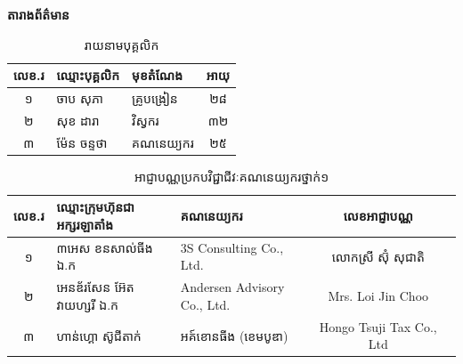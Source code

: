 \documentclass[a4paper]{article}
\begin{document}
{\NormalFont
\begin{justify}
\setlength{\baselineskip}{20pt}
\hspace{1cm}
\end{justify}
}
\begin{center}
    {\NormalFont \textbf{តារាងព័ត៌មាន}}
\end{center}

\vspace{0.5cm}

\begin{table}[h!]
    \centering
    \NormalFont\selectfont
    \begin{tabular}{|c|l|l|c|}
        \hline
        \textbf{លេខ.រ} & \textbf{ឈ្មោះបុគ្គលិក} & \textbf{មុខតំណែង} & \textbf{អាយុ} \\
        \hline
        ១ & ចាប សុភា & គ្រូបង្រៀន & ២៨ \\
        \hline
        ២ & សុខ ដារា & វិស្វករ & ៣២ \\
        \hline
        ៣ & ម៉ែន ចន្ទថា & គណនេយ្យករ & ២៥ \\
        \hline
    \end{tabular}
    \caption{រាយនាមបុគ្គលិក}
\end{table}

\begin{table}[h!]
    \NormalFont\selectfont
    \begin{tabular}{|c|l|l|c|c}
        \hline
        \textbf{លេខ.រ} & \textbf{ឈ្មោះក្រុមហ៊ុនជាអក្សរឡាតាំង} & \textbf{គណនេយ្យករ} ​& \textbf{លេខអាជ្ញាបណ្ណ} \\
        \hline
        ១ & ៣អេស ខនសាល់ធីង ឯ.ក & 3S Consulting Co., Ltd. & លោកស្រី ស៊ុំ សុជាតិ \\
        \hline
        ២ & អេនឌ័រសែន អ៊ែតវាយហ្សរី ឯ.ក & Andersen Advisory Co., Ltd. & Mrs. Loi Jin Choo  \\
        \hline
        ៣ & ហាន់ហ្គោ ស៊ូជីតាក់ & អគ៍ខោនធីង (ខេមបូឌា) & Hongo Tsuji Tax Co., Ltd \\
        \hline
        
    \end{tabular}
    \caption{អាជ្ញាបណ្ណប្រកបវិជ្ជាជីវៈគណនេយ្យករថ្នាក់១}
\end{table}
\end{document}
